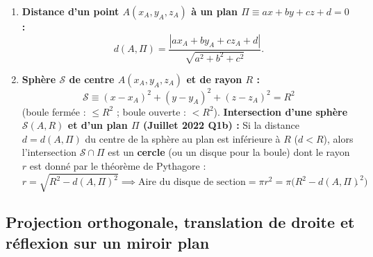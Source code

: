 \begin{theoreme}
\begin{enumerate}
\[    \]
    \item \textbf{Distance d'un point $A(x_A, y_A, z_A)$ à un plan $\Pi \equiv ax + by + cz + d = 0$ :}
    \[
        \boxed{d(A, \Pi) = \frac{|ax_A + by_A + cz_A + d|}{\sqrt{a^2 + b^2 + c^2}}}.
    \]
    \item \textbf{Sphère $\mathcal{S}$ de centre $A(x_A, y_A, z_A)$ et de rayon $R$ :}
    \[
        \boxed{\mathcal{S} \equiv (x - x_A)^2 + (y - y_A)^2 + (z - z_A)^2 = R^2}
    \]
    (boule fermée : $\le R^2$ ; boule ouverte : $< R^2$).
    \textbf{Intersection d'une sphère $\mathcal{S}(A, R)$ et d'un plan $\Pi$ (Juillet 2022 Q1b) :} Si la distance $d = d(A, \Pi)$ du centre de la sphère au plan est inférieure à $R$ ($d < R$), alors l'intersection $\mathcal{S} \cap \Pi$ est un \textbf{cercle} (ou un disque pour la boule) dont le rayon $r$ est donné par le théorème de Pythagore :
    \[
        \boxed{r = \sqrt{R^2 - d(A, \Pi)^2} \implies \text{Aire du disque de section} = \pi r^2 = \pi\bigl(R^2 - d(A,\Pi)^2\bigr)}.
    \]
\end{enumerate}
\end{theoreme}

\subsection{Projection orthogonale, translation de droite et réflexion sur un miroir plan}

